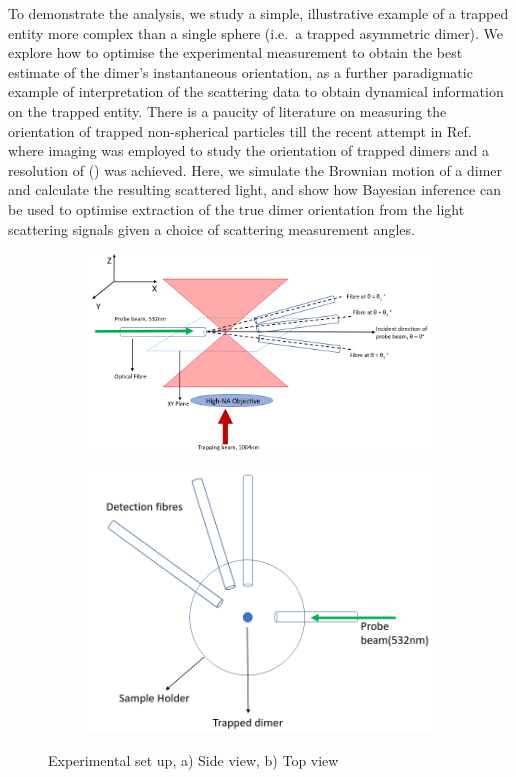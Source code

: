\documentclass[final, 3p]{elsarticle}
\begin{document}
To demonstrate the analysis, we study a simple, illustrative example
of a trapped entity more complex than a single sphere (i.e.\ a trapped
asymmetric dimer).  We explore how to optimise the experimental
measurement to obtain the best estimate of the dimer's instantaneous
orientation, as a further paradigmatic example of interpretation of
the scattering data to obtain dynamical information on the trapped
entity.  There is a paucity of literature on measuring the orientation
of trapped non-spherical particles till the recent attempt in
Ref.~ where imaging was employed to
study the orientation of trapped dimers and a resolution of () was
achieved.  Here, we simulate the Brownian motion of a dimer and
calculate the resulting scattered light, and show how Bayesian
inference can be used to optimise extraction of the true dimer
orientation from the light scattering signals given a choice of
scattering measurement angles.


\begin{figure}
\centering
\begin{subfigure}{0.45\textwidth}
	\includegraphics[width=\textwidth, height=0.25\textheight]{./Images/fig1a.png}
	\subcaption{}
\end{subfigure}
\begin{subfigure}{0.45\textwidth}
	\includegraphics[width=\textwidth, height=0.25\textheight]{./Images/fig1b.png}
	\subcaption{}
\end{subfigure}
\caption{\label{fig:setup}
  Experimental set up, a) Side view, b) Top view
%
}
\end{figure}
\end{document}
